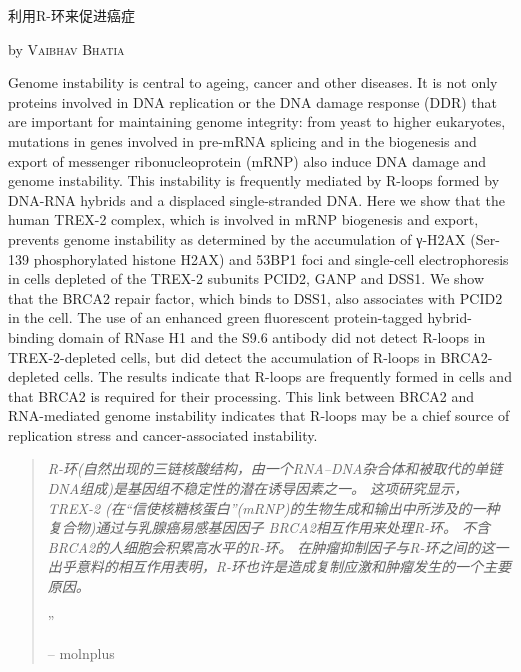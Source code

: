 \documentclass[10pt,a4paper]{article}
\newcommand{\NewsItem}[1]{ %
\usefont{T1}{fvs}{n}{n} %
\vspace{24pt}\large #1\vspace{3pt} %
\par \normalsize \normalfont}
\newcommand{\NewsAuthor}[1]{ %
\hfill by \textsc{#1} \vspace{20pt} %
\par \normalfont}
\begin{document}
\begin{multicols}{2} %

\NewsItem{利用R-环来促进癌症}
\NewsAuthor{Vaibhav Bhatia}

Genome instability is central to ageing, cancer and other diseases. It is not only proteins involved in DNA replication or the DNA damage response (DDR) that are important for maintaining genome integrity: from yeast to higher eukaryotes, mutations in genes involved in pre-mRNA splicing and in the biogenesis and export of messenger ribonucleoprotein (mRNP) also induce DNA damage and genome instability. This instability is frequently mediated by R-loops formed by DNA-RNA hybrids and a displaced single-stranded DNA. Here we show that the human TREX-2 complex, which is involved in mRNP biogenesis and export, prevents genome instability as determined by the accumulation of γ-H2AX (Ser-139 phosphorylated histone H2AX) and 53BP1 foci and single-cell electrophoresis in cells depleted of the TREX-2 subunits PCID2, GANP and DSS1. We show that the BRCA2 repair factor, which binds to DSS1, also associates with PCID2 in the cell. The use of an enhanced green fluorescent protein-tagged hybrid-binding domain of RNase H1 and the S9.6 antibody did not detect R-loops in TREX-2-depleted cells, but did detect the accumulation of R-loops in BRCA2-depleted cells. The results indicate that R-loops are frequently formed in cells and that BRCA2 is required for their processing. This link between BRCA2 and RNA-mediated genome instability indicates that R-loops may be a chief source of replication stress and cancer-associated instability.\cite{BhaBarGar1406}

\begin{quotation} %

\noindent\normalsize\textit{R-环(自然出现的三链核酸结构，由一个RNA–DNA杂合体和被取代的单链DNA组成)是基因组不稳定性的潜在诱导因素之一。
这项研究显示，TREX-2 (在“信使核糖核蛋白”(mRNP)的生物生成和输出中所涉及的一种复合物)通过与乳腺癌易感基因因子 BRCA2相互作用来处理R-环。
不含BRCA2的人细胞会积累高水平的R-环。
在肿瘤抑制因子与R-环之间的这一出乎意料的相互作用表明，R-环也许是造成复制应激和肿瘤发生的一个主要原因。}

\hfill{\Huge''}

\hfill-- molnplus
\end{quotation}



\end{multicols}
\end{document}
